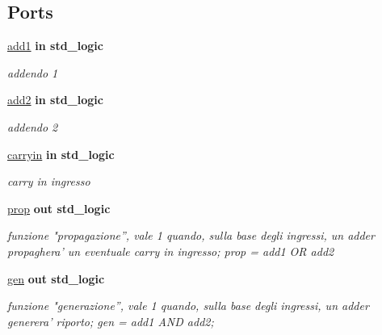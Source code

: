 \subsection*{Ports}
 \begin{DoxyCompactItemize}
\item 
\hyperlink{group___base_cell_ga2b16ee1ce0d8ffb8f85ccea13f8ba38d}{add1}  {\bfseries {\bfseries \textcolor{vhdlchar}{in}\textcolor{vhdlchar}{ }}} {\bfseries \textcolor{vhdlchar}{std\+\_\+logic}\textcolor{vhdlchar}{ }} 
\begin{DoxyCompactList}\small\item\em addendo 1 \end{DoxyCompactList}\item 
\hyperlink{group___base_cell_gac3ebb689e34fc5e7657726b18d8b5369}{add2}  {\bfseries {\bfseries \textcolor{vhdlchar}{in}\textcolor{vhdlchar}{ }}} {\bfseries \textcolor{vhdlchar}{std\+\_\+logic}\textcolor{vhdlchar}{ }} 
\begin{DoxyCompactList}\small\item\em addendo 2 \end{DoxyCompactList}\item 
\hyperlink{group___base_cell_gaa556a73dc4a4de1a0d662b25adbcbe33}{carryin}  {\bfseries {\bfseries \textcolor{vhdlchar}{in}\textcolor{vhdlchar}{ }}} {\bfseries \textcolor{vhdlchar}{std\+\_\+logic}\textcolor{vhdlchar}{ }} 
\begin{DoxyCompactList}\small\item\em carry in ingresso \end{DoxyCompactList}\item 
\hyperlink{group___base_cell_gac94466f3a0e3e34f0231abcf4b667ade}{prop}  {\bfseries {\bfseries \textcolor{vhdlchar}{out}\textcolor{vhdlchar}{ }}} {\bfseries \textcolor{vhdlchar}{std\+\_\+logic}\textcolor{vhdlchar}{ }} 
\begin{DoxyCompactList}\small\item\em funzione "propagazione”, vale 1 quando, sulla base degli ingressi, un adder propaghera' un eventuale carry in ingresso; prop = add1 O\+R add2 \end{DoxyCompactList}\item 
\hyperlink{group___base_cell_gaad65a9c9ebd4dd83c2835249a1ba2dff}{gen}  {\bfseries {\bfseries \textcolor{vhdlchar}{out}\textcolor{vhdlchar}{ }}} {\bfseries \textcolor{vhdlchar}{std\+\_\+logic}\textcolor{vhdlchar}{ }} 
\begin{DoxyCompactList}\small\item\em funzione "generazione”, vale 1 quando, sulla base degli ingressi, un adder generera' riporto; gen = add1 A\+N\+D add2; \end{DoxyCompactList}\item 

\end{DoxyCompactItemize}
